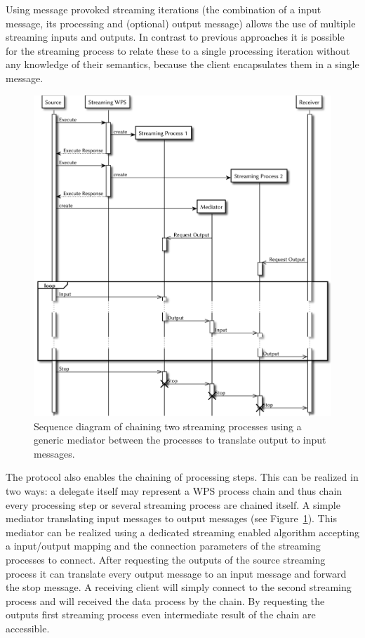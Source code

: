 	Using message provoked streaming iterations (the combination of a input message, its processing and (optional) output message) allows the use of multiple streaming inputs and outputs. In contrast to previous approaches it is possible for the streaming process to relate these to a single processing iteration without any knowledge of their semantics, because the client encapsulates them in a single message.

	\begin{figure}[!htb]
		\centering
		\includegraphics[width=\textwidth]{figures/sequence-diagramm-chain.pdf} %
		\caption{\label{fig:sd:chain} Sequence diagram of chaining two streaming processes using a generic mediator between the processes to translate output to input messages.}
	\end{figure}

	The protocol also enables the chaining of processing steps. This can be realized in two ways: a delegate itself may represent a \ac{WPS} process chain and thus chain every processing step or several streaming process are chained itself. A simple mediator translating input messages to output messages (see Figure~\ref{fig:sd:chain}). This mediator can be realized using a dedicated streaming enabled algorithm accepting a input/output mapping and the connection parameters of the streaming processes to connect. After requesting the outputs of the source streaming process it can translate every output message to an input message and forward the stop message. A receiving client will simply connect to the second streaming process and will received the data process by the chain. By requesting the outputs first streaming process even intermediate result of the chain are accessible.

